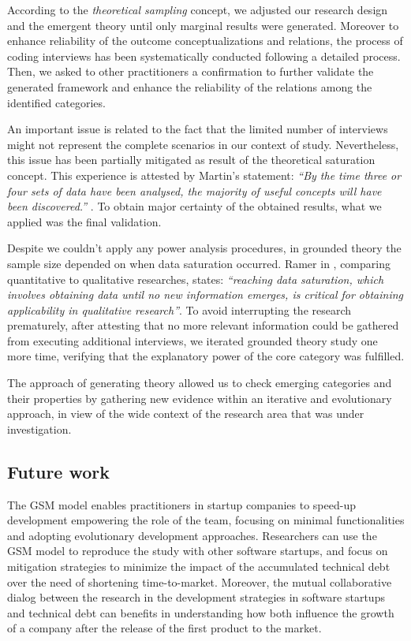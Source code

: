 \documentclass[10pt,journal,letterpaper,compsoc]{IEEEtran}
\begin{document}
According to the \textit{theoretical sampling} concept, we adjusted our 
research design and the emergent theory until only marginal results were 
generated. Moreover to enhance reliability of the outcome conceptualizations and 
relations, the process of coding interviews has been systematically conducted 
following a detailed process. Then, we asked to other practitioners a 
confirmation to further validate the generated framework and enhance the 
reliability of the relations among the identified categories.

An important issue is related to the fact that the limited number of interviews 
might not represent the complete scenarios in our context of study. 
Nevertheless, this issue has been partially mitigated as result of the 
theoretical saturation concept. This experience is attested by Martin's 
statement: \textit{``By the time three or four sets of data have been analysed, 
the majority of useful concepts will have been discovered.''} 
\cite{giardinoEtAl}. To obtain major certainty of the obtained results, what we 
applied was the final validation.

Despite we couldn't apply any power analysis procedures, in grounded theory the 
sample size depended on when data saturation occurred. Ramer in \cite{Ramer}, 
comparing quantitative to qualitative researches, states: \textit{``reaching 
data saturation, which involves obtaining data until no new information emerges, 
is critical for obtaining applicability in qualitative research''}. To avoid 
interrupting the research prematurely, after attesting that no more relevant 
information could be gathered from executing additional interviews, we iterated 
grounded theory study one more time, verifying that the explanatory power of the 
core category was fulfilled.

The  approach of generating theory allowed us to check emerging categories 
and their properties by gathering new evidence within an iterative and 
evolutionary approach, in view of the wide context of the research area that was 
under investigation.
\subsection{Future work}
\label{futwork}

The GSM model enables practitioners in startup companies to speed-up 
development empowering the role of the team, focusing on minimal functionalities 
and adopting evolutionary development approaches. Researchers can use the GSM 
model to reproduce the study with other software startups, and focus on 
mitigation strategies to minimize the impact of the accumulated technical debt 
over the need of shortening time-to-market. Moreover, the  mutual collaborative 
dialog between the research in the development strategies in software startups 
and technical debt can benefits in understanding how both influence the growth 
of a company after the release of the first product to the market.
\end{document}
